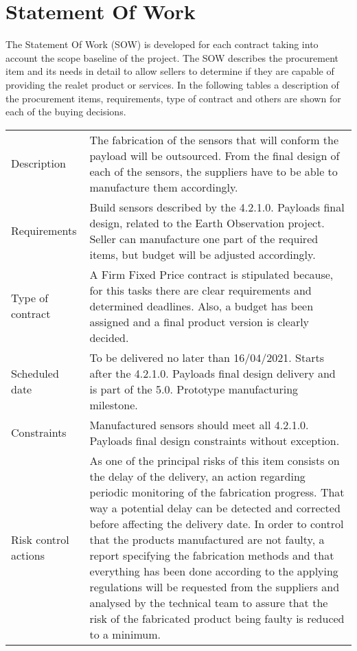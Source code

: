 \section{Statement Of Work}
The Statement Of Work (SOW) is developed for each contract taking into account the scope baseline of the project. The SOW describes the procurement item and its needs in detail to allow sellers to determine if they are capable of providing the realet product or services.
In the following tables a description of the procurement items, requirements, type of contract and others are shown for each of the buying decisions.
\begin{table}[H]
	\centering
	\begin{tabular}
		{>{\raggedright\arraybackslash}p{3cm} >{\arraybackslash}p{11cm}}
		
		\toprule[2pt]
		
		\multicolumn{2}{c}{\textbf{SOW - 5.1.1. Manufacturing of payload sensors}}\\
		
		\midrule[1.5pt]
		
		Description & The fabrication of the sensors that will conform the payload will be outsourced. From the final design of each of the sensors, the suppliers have to be able to manufacture them accordingly. \\
		\hline
		
		Requirements & Build sensors described by the 4.2.1.0. Payloads final design, related to the Earth Observation project. Seller can manufacture one part of the required items, but budget will be adjusted accordingly.\\
		\hline
		
		Type of contract & A Firm Fixed Price contract is stipulated because, for this tasks there are clear requirements and determined deadlines. Also, a budget has been assigned and a final product version is clearly decided.\\
		\hline
		
		Scheduled date & To be delivered no later than 16/04/2021. Starts after the 4.2.1.0. Payloads final design delivery and is part of the 5.0. Prototype manufacturing milestone.\\
		\hline
		
		Constraints & Manufactured sensors should meet all 4.2.1.0. Payloads final design constraints without exception.\\
		\hline
		
		Risk control actions & As one of the principal risks of this item consists on the delay of the delivery, an action regarding periodic monitoring of the fabrication progress. That way a potential delay can be detected and corrected before affecting the delivery date.
		In order to control that the products manufactured are not faulty, a report specifying the fabrication methods and that everything has been done according to the applying regulations will be requested from the suppliers and analysed by the technical team to assure that the risk of the fabricated product being faulty is reduced to a minimum.\\
		\hline
		

\end{tabular}
\end{table}

